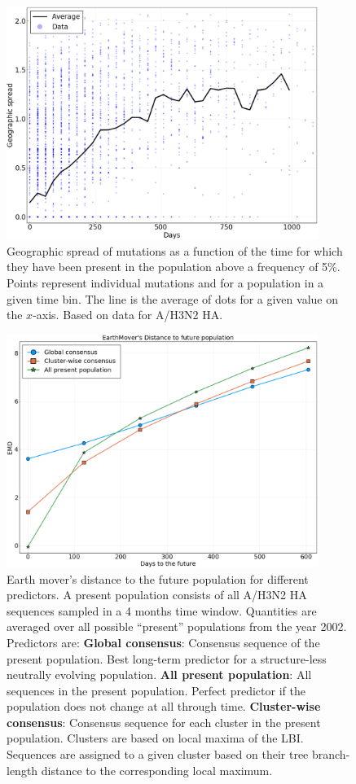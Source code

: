 \documentclass[reprint,amsmath,amssymb,superscriptaddress,showpacs,rmp]{revtex4-1}
\begin{document}
	\begin{figure}
		\centering
		\includegraphics[width=0.9\textwidth]{SM_figures/GeoSpread_v_time_ha.png}
		\caption{Geographic spread of mutations as a function of the time for which they have been present in the population above a frequency of 5\%. Points represent individual mutations and for a population in a given time bin. The line is the average of dots for a given value on the $x$-axis. Based on data for A/H3N2 HA.}
		\label{fig:geospread_v_time}
	\end{figure}


	\begin{figure}
		\centering
		\includegraphics[width=0.9\textwidth]{SM_figures/EMD_to_future.png}
		\caption{Earth mover's distance to the future population for different predictors. A present population consists of all A/H3N2 HA sequences sampled in a 4 months time window. Quantities are averaged over all possible ``present'' populations from the year 2002. Predictors are: \textbf{Global consensus}: Consensus sequence of the present population. Best long-term predictor for a structure-less neutrally evolving population. \textbf{All present population}: All sequences in the present population. Perfect predictor if the population does not change at all through time. \textbf{Cluster-wise consensus}: Consensus sequence for each cluster in the present population. Clusters are based on local maxima of the LBI. Sequences are assigned to a given cluster based on their tree branch-length distance to the corresponding local maximum.}
		\label{fig:emd_to_future}
	\end{figure}
\end{document}
